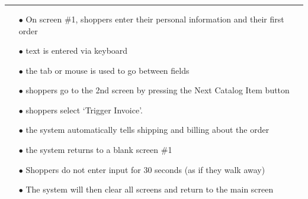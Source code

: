 \documentclass[pdf]{beamer}
\begin{document}
{%
\begin{frame}
\frametitle{\textcolor{myBlue}{\textbf{\hspace{8mm}{Specifications}}}}
\vspace*{-3mm}
\textcolor{red}{\rule{10cm}{1mm}}

\textcolor{myBlue}{\textbf{\footnotesize{\hspace{2mm}{To create an order}}}}
\begin{itemize}
\setlength{\itemindent}{0.5cm}
\setlength{\itemsep}{-0.5mm}
	\item[\textcolor{myBlue}{$\bullet$}]\textcolor{myBlue}{{\scriptsize On screen \#1, shoppers enter their personal information and their first order }}
   	\item[\textcolor{myBlue}{$\bullet$}]\textcolor{myBlue}{{\scriptsize text is entered via keyboard}}
	\item[\textcolor{myBlue}{$\bullet$}]\textcolor{myBlue}{{\scriptsize the tab or mouse is used to go between fields}}
\end{itemize} 

\textcolor{myBlue}{\textbf{\footnotesize{\hspace{2mm}{Further orders}}}}
\begin{itemize}
\setlength{\itemindent}{0.5cm}
	\item[\textcolor{myBlue}{$\bullet$}]\textcolor{myBlue}{{\scriptsize shoppers go to the 2nd screen by pressing the Next Catalog Item button}}
\end{itemize}

\textcolor{myBlue}{\textbf{\footnotesize{\hspace{2mm}{Order completion}}}}
\begin{itemize}
\setlength{\itemindent}{0.5cm}
\setlength{\itemsep}{-0.5mm}
	\item[\textcolor{myBlue}{$\bullet$}]\textcolor{myBlue}{{\scriptsize shoppers select ‘Trigger Invoice’. }}
    \item[\textcolor{myBlue}{$\bullet$}]\textcolor{myBlue}{{\scriptsize the system automatically tells shipping and billing about the order}}
	\item[\textcolor{myBlue}{$\bullet$}]\textcolor{myBlue}{{\scriptsize the system returns to a blank screen \#1}}
\end{itemize}

\textcolor{myBlue}{\textbf{\footnotesize{\hspace{2mm}{To cancel order}}}}
\begin{itemize}
\setlength{\itemindent}{0.5cm}
\setlength{\itemsep}{-0.5mm}
	\item[\textcolor{myBlue}{$\bullet$}]\textcolor{myBlue}{{\scriptsize Shoppers do not enter input for 30 seconds (as if they walk away)}}
    \item[\textcolor{myBlue}{$\bullet$}]\textcolor{myBlue}{{\scriptsize The system will then clear all screens and return to the main screen }}
\end{itemize} 


\end{frame}}
\end{document}
